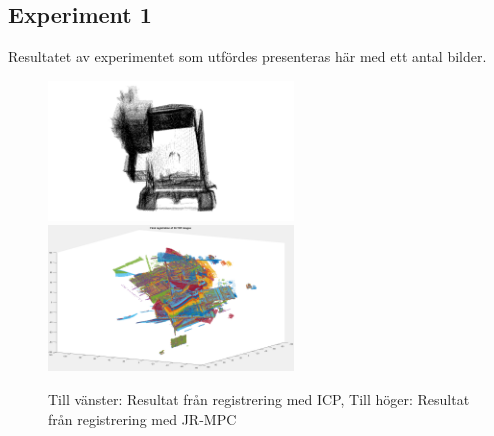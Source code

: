 \subsection{Experiment 1}

Resultatet av experimentet som utfördes presenteras här med ett antal bilder.  

\begin{figure}[H]
	\centering
	\includegraphics[width=65mm]{figures/first_registered_church.png}
	\includegraphics[width=65mm]{figures/JRMPC_result.png}
	\caption{Till vänster: Resultat från registrering med ICP, Till höger: Resultat från registrering med JR-MPC}
	\label{fig:icp_vs_jrmpc_result}
\end{figure}

